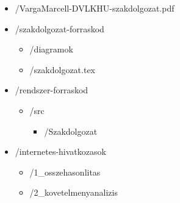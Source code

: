 \documentclass[a4paper,12pt,oneside]{report}
\begin{document}
\begin{itemize}
    \item[] /VargaMarcell-DVLKHU-szakdolgozat.pdf
    \item[] /szakdolgozat-forraskod
    \begin{itemize}
        \item[] /diagramok
        \item[] /szakdolgozat.tex
    \end{itemize}
    
    \item[] /rendszer-forraskod
    \begin{itemize}
        \item[] /src
        \begin{itemize}
            \item[] /Szakdolgozat
        \end{itemize}
        
    \end{itemize}
    
    \item[] /internetes-hivatkozasok
    \begin{itemize}
        \item[] /1\_osszehasonlitas
        \item[] /2\_kovetelmenyanalizis
    \end{itemize}
\end{itemize}
\end{document}
